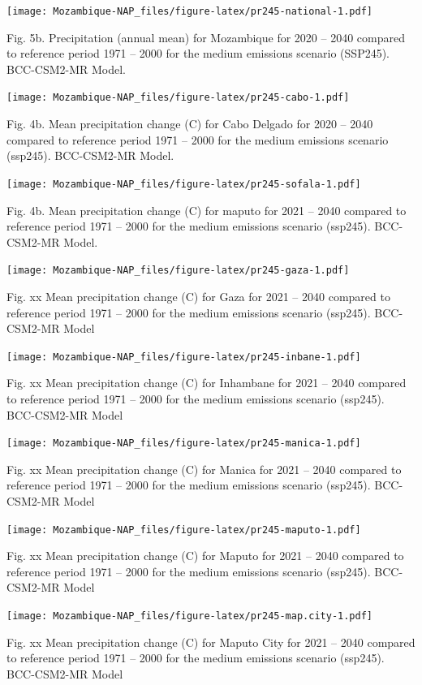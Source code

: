 \documentclass[
]{book}
\begin{document}
\texttt{[image: Mozambique-NAP\_files/figure-latex/pr245-national-1.pdf]}

Fig. 5b. Precipitation (annual mean) for Mozambique for 2020 -- 2040 compared to reference period 1971 -- 2000 for the medium emissions scenario (SSP245). BCC-CSM2-MR Model.

\texttt{[image: Mozambique-NAP\_files/figure-latex/pr245-cabo-1.pdf]}

Fig. 4b. Mean precipitation change (C) for Cabo Delgado for 2020 -- 2040 compared to reference period 1971 -- 2000 for the medium emissions scenario (ssp245). BCC-CSM2-MR Model.

\texttt{[image: Mozambique-NAP\_files/figure-latex/pr245-sofala-1.pdf]}

Fig. 4b. Mean precipitation change (C) for maputo for 2021 -- 2040 compared to reference period 1971 -- 2000 for the medium emissions scenario (ssp245). BCC-CSM2-MR Model.

\texttt{[image: Mozambique-NAP\_files/figure-latex/pr245-gaza-1.pdf]}

Fig. xx Mean precipitation change (C) for Gaza for 2021 -- 2040 compared to reference period 1971 -- 2000 for the medium emissions scenario (ssp245). BCC-CSM2-MR Model

\texttt{[image: Mozambique-NAP\_files/figure-latex/pr245-inbane-1.pdf]}

Fig. xx Mean precipitation change (C) for Inhambane for 2021 -- 2040 compared to reference period 1971 -- 2000 for the medium emissions scenario (ssp245). BCC-CSM2-MR Model

\texttt{[image: Mozambique-NAP\_files/figure-latex/pr245-manica-1.pdf]}

Fig. xx Mean precipitation change (C) for Manica for 2021 -- 2040 compared to reference period 1971 -- 2000 for the medium emissions scenario (ssp245). BCC-CSM2-MR Model

\texttt{[image: Mozambique-NAP\_files/figure-latex/pr245-maputo-1.pdf]}

Fig. xx Mean precipitation change (C) for Maputo for 2021 -- 2040 compared to reference period 1971 -- 2000 for the medium emissions scenario (ssp245). BCC-CSM2-MR Model

\texttt{[image: Mozambique-NAP\_files/figure-latex/pr245-map.city-1.pdf]}

Fig. xx Mean precipitation change (C) for Maputo City for 2021 -- 2040 compared to reference period 1971 -- 2000 for the medium emissions scenario (ssp245). BCC-CSM2-MR Model
\end{document}
